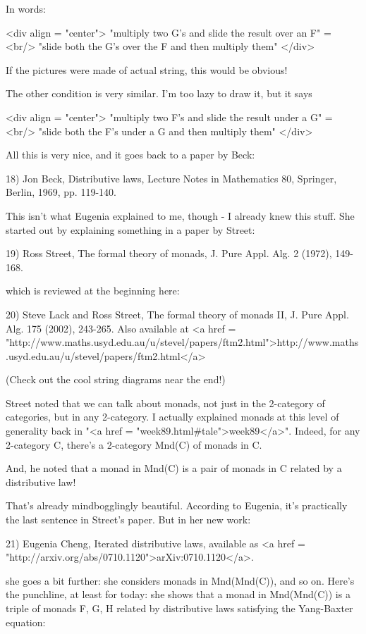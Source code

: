 In words: 

<div align = "center">
 "multiply two G's and slide the result over an F" = <br/>
 "slide both the G's over the F and then multiply them"
</div>

If the pictures were made of actual string, this would be obvious!

The other condition is very similar.  I'm too lazy to draw it,
but it says 

<div align = "center">
 "multiply two F's and slide the result under a G" = <br/>
 "slide both the F's under a G and then multiply them"
</div>

All this is very nice, and it goes back to a paper by Beck:

18) Jon Beck, Distributive laws, Lecture Notes in Mathematics 
80, Springer, Berlin, 1969, pp. 119-140. 

This isn't what Eugenia explained to me, though - I already knew
this stuff.  She started out by explaining something in a paper 
by Street:

19) Ross Street, The formal theory of monads, J. Pure Appl. Alg.
2 (1972), 149-168.

which is reviewed at the beginning here:

20) Steve Lack and Ross Street, The formal theory of monads II,
J. Pure Appl. Alg. 175 (2002), 243-265.  Also available at
<a href = "http://www.maths.usyd.edu.au/u/stevel/papers/ftm2.html">http://www.maths.usyd.edu.au/u/stevel/papers/ftm2.html</a>

(Check out the cool string diagrams near the end!)  

Street noted that we can talk about monads, not just in the
2-category of categories, but in any 2-category.  I actually 
explained monads at this level of generality back in 
"<a href = "week89.html#tale">week89</a>".
Indeed, for any 2-category C, there's a 2-category Mnd(C)
of monads in C.  

And, he noted that a monad in Mnd(C) is a pair of monads in C
related by a distributive law!

That's already mindbogglingly beautiful.  According to Eugenia,
it's practically the last sentence in Street's paper.  But in her new work:

21) Eugenia Cheng, Iterated distributive laws, available as
<a href = "http://arxiv.org/abs/0710.1120">arXiv:0710.1120</a>.

she goes a bit further: she considers monads in Mnd(Mnd(C)), 
and so on.   Here's the punchline, at least for today: she shows 
that a monad in Mnd(Mnd(C)) is a triple of monads F, G, H related 
by distributive laws satisfying the Yang-Baxter equation:
  
